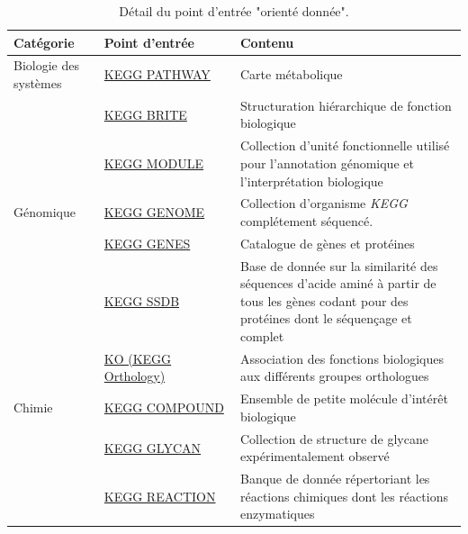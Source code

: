 \begin{refsegment}
    
    \begin{table}[H]
        \small
        \caption{Détail du point d'entrée "orienté donnée". }\label{tab:kegg_data_oriented}
        \label{tab:kegg_oriented_data} 
        \begin{tabular}{p{0.2\linewidth}|p{0.3\linewidth}|p{0.5\linewidth}}
            \toprule
            Catégorie               & Point d'entrée                                                        & Contenu \\
            \midrule
            Biologie des systèmes  & \href{http://www.genome.jp/kegg/pathway.html}{KEGG PATHWAY}           & Carte métabolique \\   
            \cline{2-3}
                                    & \href{http://www.genome.jp/kegg/brite.html}{KEGG BRITE}               & Structuration hiérarchique de fonction biologique \\
            \cline{2-3}             & \href{http://www.genome.jp/kegg/module.html}{KEGG MODULE}             & Collection d'unité fonctionnelle utilisé pour l'annotation génomique et l'interprétation biologique \\
            \hline
            Génomique               & \href{http://www.genome.jp/kegg/genome.html}{KEGG GENOME}             & Collection d'organisme \textit{KEGG} complétement séquencé. \\
            \cline{2-3}             & \href{http://www.genome.jp/kegg/genes.html}{KEGG GENES}               & Catalogue de gènes et protéines \\
            \cline{2-3}             & \href{http://www.kegg.jp/kegg/ssdb/}{KEGG SSDB}                       & Base de donnée sur la similarité des séquences d'acide aminé à partir de tous les gènes codant pour des protéines dont le séquençage et complet \\
            \cline{2-3}             & \href{http://www.genome.jp/kegg/ko.html}{KO (KEGG Orthology)}         & Association des fonctions biologiques aux différents groupes orthologues  \\
            \hline
            Chimie                  & \href{http://www.genome.jp/kegg/compound/}{KEGG COMPOUND}             & Ensemble de petite molécule d'intérêt biologique\\
            \cline{2-3}             & \href{http://www.genome.jp/kegg/glycan/}{KEGG GLYCAN}                 & Collection de structure de glycane expérimentalement observé \\
            \cline{2-3}             & \href{http://www.genome.jp/kegg/reaction/}{KEGG REACTION}             & Banque de donnée répertoriant les réactions chimiques dont les réactions enzymatiques\\

\end{tabular}
\end{table}
\end{refsegment}
